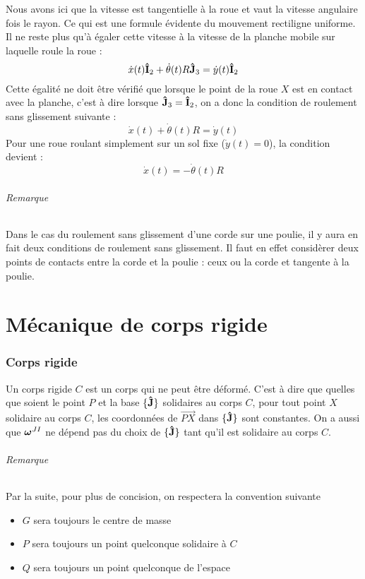 Nous avons ici que la vitesse est tangentielle à la roue et vaut la vitesse angulaire fois le rayon.
Ce qui est une formule évidente du mouvement rectiligne uniforme.
Il ne reste plus qu'à égaler cette vitesse à la vitesse de la planche mobile sur laquelle roule la roue :
\[ \dot{x}(t){\bf\hat{I}}_2 + \dot{\theta}(t) R {\bf\hat{J}}_3 = \dot{y}(t){\bf\hat{I}}_2 \]
Cette égalité ne doit être vérifié que lorsque le point de la roue $X$ est en contact avec la planche, 
c'est à dire lorsque ${\bf\hat{J}}_3 = {\bf\hat{I}}_2$, on a donc la condition de roulement sans glissement suivante :
\[ \dot{x}(t) + \dot{\theta}(t) R = \dot{y}(t) \]
Pour une roue roulant simplement sur un sol fixe ($\dot{y}(t) = 0$), la condition devient :
\[ \dot{x}(t) = -\dot{\theta}(t) R \]

\paragraph{Remarque}
Dans le cas du roulement sans glissement d'une corde sur une poulie, il y aura en fait deux conditions
de roulement sans glissement. Il faut en effet considèrer deux points de contacts entre la corde et la
poulie : ceux ou la corde et tangente à la poulie.

\part{Mécanique de corps rigide}
\section{Corps rigide}
Un corps rigide $C$ est un corps qui ne peut être déformé.
C'est à dire que quelles que soient le point $P$ et la base $\{{\bf\hat{J}}\}$ solidaires au corps $C$, pour tout point $X$ solidaire au corps $C$, les coordonnées de $\vec{PX}$ dans $\{{\bf\hat{J}}\}$ sont constantes.
On a aussi que ${\bm \omega}^{JI}$ ne dépend pas du choix de $\{{\bf\hat{J}}\}$ tant qu'il est solidaire au corps $C$.

\paragraph{Remarque}
Par la suite, pour plus de concision, on respectera la convention suivante
\begin{itemize}
  \item $G$ sera toujours le centre de masse
  \item $P$ sera toujours un point quelconque solidaire à $C$
  \item $Q$ sera toujours un point quelconque de l'espace
\end{itemize}

